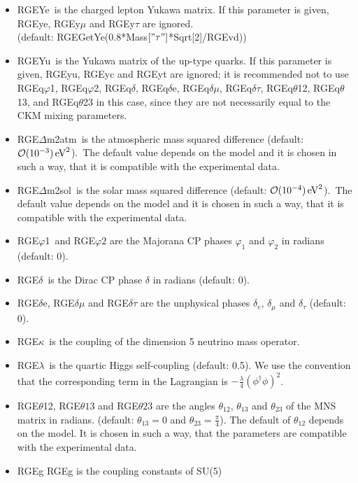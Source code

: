 \documentclass[10pt,a4paper,twoside]{scrartcl}
\begin{document}
\begin{itemize}
\item RGEYe\ is the charged lepton Yukawa matrix.
  If this parameter is given, RGEye, RGEy$\mu$ and RGEy$\tau$ are
  ignored.
    \\ (default:
  RGEGetYe(0.8*Mass$\left[\mathrm{"}\tau\mathrm{"}\right]$*Sqrt[2]/RGEvd))
  
\item RGEYu\ is the Yukawa matrix of the up-type quarks.
  If this parameter is given, RGEyu, RGEyc and RGEyt are ignored;
  it is recommended not to use RGEq$\varphi$1, RGEq$\varphi$2,
  RGEq$\delta$, RGEq$\delta$e, RGEq$\delta\mu$, RGEq$\delta\tau$,
  RGEq$\theta$12, RGEq$\theta$13, and RGEq$\theta$23 in this case, since
  they are not necessarily equal to the CKM mixing parameters.
\item RGE$\Delta$m2atm\ is the atmospheric mass squared difference (default: $ \mathcal{O}(10^{-3}) \,\mathrm{eV}^2$).\ The default value depends on the
  model and it is chosen in such a way, that it is compatible with the
  experimental data.
  
\item RGE$\Delta$m2sol\ is the solar mass squared difference (default:
  $\mathcal{O}(10^{-4}) \,\mathrm{eV}^2$).\ The default value depends on the
  model and it is chosen in such a way, that it is compatible with the
  experimental data.
\item RGE$\varphi$1\ and RGE$\varphi2$ are the Majorana CP phases $\varphi_1$ and $\varphi_2$ in radians (default: $0$).
  
\item RGE$\delta$\ is the Dirac CP phase $\delta$ in radians (default: $0$).
\item RGE$\delta$e, RGE$\delta\mu$ and RGE$\delta\tau$ are the unphysical phases $\delta_e$,
  $\delta_\mu$ and $\delta_\tau$ (default: $0$). 
\item RGE$\kappa$\ is the coupling of the dimension 5 neutrino mass operator.
  
\item RGE$\lambda$\ is the quartic Higgs self-coupling (default: 0.5).  We use the
  convention that the corresponding term in the Lagrangian is
  $-\frac{\lambda}{4} (\phi^\dagger \phi)^2$.
  
\item RGE$\theta$12, RGE$\theta13$ and RGE$\theta23$ are the angles $\theta_{12}$, $\theta_{13}$
and $\theta_{23}$ of the MNS matrix in radians. (default: $\theta_{13}=0$ and
$\theta_{23}=\frac{\pi}{4}$). The default of $\theta_{12}$ depends on the
model. It is chosen in such a way, that the parameters are compatible with the
experimental data. 
\item RGEg RGEg is the coupling constants of SU(5)
  

\end{itemize}
\end{document}
